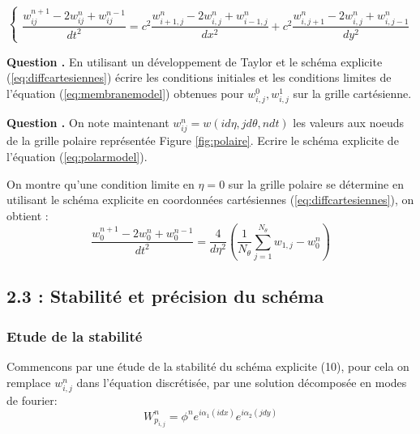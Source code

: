 \documentclass[a4,12pt]{article}
\newcounter{Nbquestion}
\newcommand*\question{%
  \stepcounter{Nbquestion}%
  \textbf{Question \theNbquestion. }}
\begin{document}
			  \begin{equation}
			    \left\{
			      \begin{array}{rl}
				\dfrac{w_{ij}^{n+1}-2w_{ij}^{n}+w_{ij}^{n-1}}{dt^{2}}=c^2\dfrac{w_{i+1,j}^{n}-2w_{i,j}^{n}+w_{i-1,j}^{n}}
				{dx^{2}}+c^2\dfrac{w_{i,j+1}^{n}-2w_{i,j}^{n}+w_{i,j-1}^{n}}{dy^{2}}
			      \end{array}
			      \right.
			      \label{eq:diffcartesiennes}
			    \end{equation}


			    \question En utilisant un développement de Taylor  et le  schéma explicite (\ref{eq:diffcartesiennes}) écrire les conditions initiales et les conditions limites de l'équation (\ref{eq:membranemodel}) obtenues pour $w_{i,j}^0,w_{i,j}^1$ sur la grille cartésienne.



			    \question On note maintenant $w_{ij}^{n}=w(id\eta,jd\theta,ndt)$ les valeurs aux noeuds de la grille polaire représentée Figure \ref{fig:polaire}. Ecrire le schéma explicite de l'équation (\ref{eq:polarmodel}).


			    On montre qu'une condition limite en $\eta=0$ sur la grille polaire se détermine en utilisant le schéma explicite en coordonnées cartésiennes (\ref{eq:diffcartesiennes}), on obtient :
			    \[
			      \dfrac{w_0^{n+1}-2 w_0^{n}+ w_{0}^{n-1}}{dt^2}=\dfrac{4}{d \eta^2}\left(\frac{1}{N_\theta} \sum_{j=1}^{N_\theta} w_{1,j}-w_{0}^{n}\right)
			    \]

			    \subsection*{2.3 : Stabilité et précision du schéma}

			    \subsubsection{Etude de la stabilité}
			    Commencons par une étude de la stabilité du schéma explicite (10), pour cela on remplace $w_{i,j}^{n}$ dans l'équation discrétisée, par une solution décomposée en modes de fourier: 
			    \[
			      W_{p_{i,j}}^{n}=\phi^n e^{i\alpha_1(idx)}e^{i\alpha_2(jdy)}
			    \]

\end{document}
